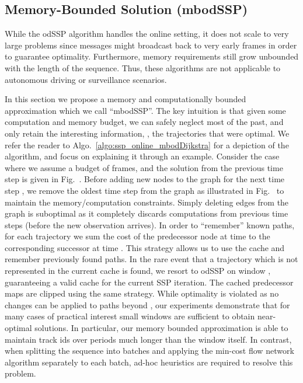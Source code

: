 \documentclass[10pt,twocolumn,letterpaper]{article}
\newcommand{\subfigref}[1]{Fig.~\subref*{#1}}
\newcommand{\algref}[1]{Algo.~\ref{#1}}
\begin{document}
\subsection{Memory-Bounded Solution (mbodSSP)}\label{sec:mbodDijkstra}

While the odSSP algorithm handles the online setting, it does not scale to  very large problems since messages might broadcast back to very early frames in order to guarantee optimality. Furthermore, memory requirements still grow unbounded  with the length of the sequence. 
Thus,  these algorithms are not applicable to autonomous driving or surveillance scenarios.

In this section we propose a memory and computationally bounded approximation which we call ``mbodSSP''. 
The key intuition is that given some computation and memory budget, we can safely neglect  most of the past, and only retain the interesting information, \ie, the trajectories that were optimal. 
We refer the reader to \algref{algo:ssp_online_mbodDijkstra} for a depiction of the algorithm, and focus on explaining it through an example. 
Consider the case where we assume a budget of  frames, and   the solution from the previous time step is given in \subfigref{fig:odDijkstra:g}. Before adding new nodes to the graph for the next time step , we remove the oldest time step  from the graph as illustrated in \subfigref{fig:odDijkstra:h} to maintain the memory/computation constraints.
Simply deleting edges from the graph is suboptimal as it completely discards computations from  previous time steps (before the new observation arrives).
In order to ``remember'' known paths, for each trajectory we sum the cost of the predecessor node at time  to the  corresponding successor at time . 
This strategy allows us to use the cache and remember previously found paths.
In the rare event that a trajectory which is not represented in the current cache is found,  we resort to odSSP on window , guaranteeing a valid cache for the current SSP iteration. 
The cached predecessor maps are clipped using the same strategy. 
While optimality is violated as no changes can be applied to paths beyond , our experiments demonstrate that for many cases of practical interest small windows are sufficient to obtain near-optimal solutions. In particular, our memory bounded approximation is able to maintain track ids over periods much longer than the window itself. In contrast, when splitting the sequence into batches and applying the min-cost flow network algorithm separately to each batch, ad-hoc heuristics are required to resolve this problem.
\end{document}
